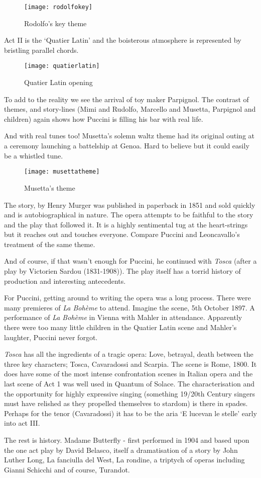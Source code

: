 \begin{figure}[H]
\centering
\texttt{[image: rodolfokey]}\caption{Rodolfo's key theme}
\label{fig:rodolfokey}
\end{figure}

Act II is the `Quatier Latin' and the boisterous atmosphere is represented by bristling parallel chords. 

\begin{figure}[H]
\centering
\texttt{[image: quatierlatin]}\caption{Quatier Latin opening}
\label{fig:quatierlatin}
\end{figure}

To add to the reality we see the arrival of toy maker Parpignol. The contrast of themes, and story-lines (Mimi and Rudolfo, Marcello and Musetta, Parpignol and children) again shows how Puccini is filling his bar with real life.

And with real tunes too! Musetta's solemn waltz theme had its original outing at a ceremony launching a battelship at Genoa. Hard to believe but it could easily be a whistled tune. 

\begin{figure}[H]
\centering
\texttt{[image: musettatheme]}\caption{Musetta's theme}
\label{fig:musettatheme}
\end{figure}

The story, by Henry Murger was published in paperback in 1851 and sold quickly and is autobiographical in nature. The opera attempts to be faithful to the story and the play that followed it. It is a highly sentimental tug at the heart-strings but it reaches out and touches everyone. Compare Puccini and Leoncavallo's treatment of the same theme. 

And of course, if that wasn't enough for Puccini, he continued with \textit{Tosca} (after a play by Victorien Sardou (1831-1908)). The play itself has a torrid history of production and interesting antecedents.

For Puccini, getting around to writing the opera was a long process. There were many premieres of \textit{La Boh\`eme} to attend. Imagine the scene, 5th October 1897. A performance of \textit{La Boh\`eme} in Vienna with Mahler in attendance. Apparently there were too many little children in the Quatier Latin scene and Mahler's laughter, Puccini never forgot.   

\textit{Tosca} has all the ingredients of a tragic opera: Love, betrayal, death between the three key characters; Tosca, Cavaradossi and Scarpia. The scene is Rome, 1800. It does have some of the most intense confrontation scenes in Italian opera and the last scene of Act 1 was well used in Quantum of Solace. The characterisation and the opportunity for highly expressive singing (something 19/20th Century singers must have relished as they propelled themselves to stardom) is there in spades. Perhaps for the tenor (Cavaradossi) it has to be the aria `E lucevan le stelle' early into act III. 

The rest is history. Madame Butterfly - first performed in 1904 and based upon the one act play by David Belasco, itself a dramatisation of a story by John Luther Long, La fanciulla del West, La rondine, a triptych of operas including Gianni Schicchi and of course, Turandot.
  









